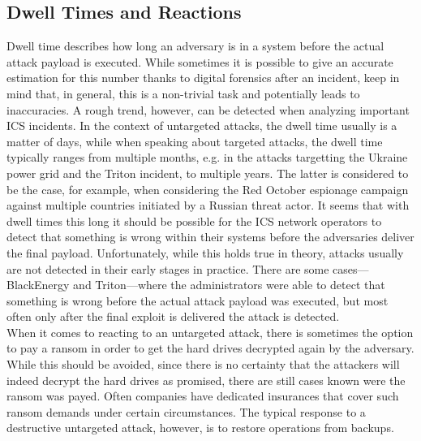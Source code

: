 \documentclass[runningheads]{llncs}
\begin{document}
\subsection{Dwell Times and Reactions}
Dwell time describes how long an adversary is in a system before the actual attack payload is executed.
While sometimes it is possible to give an accurate estimation for this number thanks to digital forensics after an incident, keep in mind that, in general, this is a non-trivial task and potentially leads to inaccuracies.
A rough trend, however, can be detected when analyzing important ICS incidents.
In the context of untargeted attacks, the dwell time usually is a matter of days, while when speaking about targeted attacks, the dwell time typically ranges from multiple months, e.g. in the attacks targetting the Ukraine power grid and the Triton incident, to multiple years.
The latter is considered to be the case, for example, when considering the Red October espionage campaign against multiple countries initiated by a Russian threat actor.
It seems that with dwell times this long it should be possible for the ICS network operators to detect that something is wrong within their systems before the adversaries deliver the final payload.
Unfortunately, while this holds true in theory, attacks usually are not detected in their early stages in practice.
There are some cases---BlackEnergy and Triton---where the administrators were able to detect that something is wrong before the actual attack payload was executed, but most often only after the final exploit is delivered the attack is detected.\\
When it comes to reacting to an untargeted attack, there is sometimes the option to pay a ransom in order to get the hard drives decrypted again by the adversary.
While this should be avoided, since there is no certainty that the attackers will indeed decrypt the hard drives as promised, there are still cases known were the ransom was payed.
Often companies have dedicated insurances that cover such ransom demands under certain circumstances.
The typical response to a destructive untargeted attack, however, is to restore operations from backups.
\end{document}
